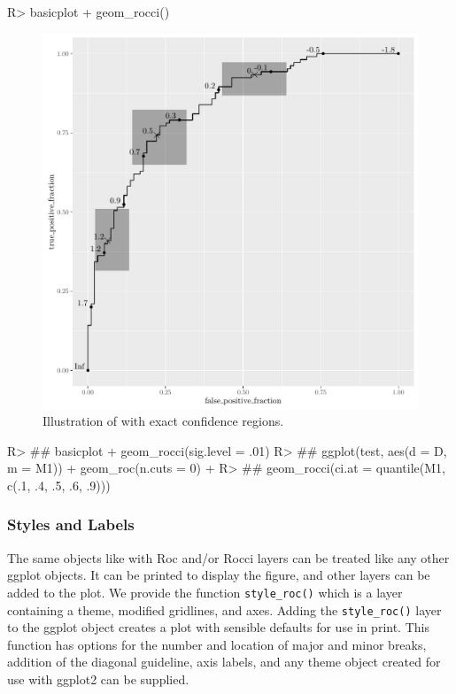 \documentclass[codesnippet]{jss}
\begin{document}
\begin{Schunk}
\begin{Sinput}
R> basicplot + geom_rocci()
\end{Sinput}
\begin{figure}
\includegraphics{figure/test-a-ci-1} \caption{Illustration of  with exact confidence regions. \label{ciex}}\label{fig:test-a-ci}
\end{figure}
\begin{Sinput}
R> ## basicplot + geom_rocci(sig.level = .01)
R> ## ggplot(test, aes(d = D, m = M1)) + geom_roc(n.cuts = 0) +
R> ##   geom_rocci(ci.at = quantile(M1, c(.1, .4, .5, .6, .9)))
\end{Sinput}
\end{Schunk}

\subsubsection{Styles and Labels}\label{styles-and-labels}

The same objects like  with Roc and/or Rocci layers can
be treated like any other ggplot objects. It can be printed to display
the figure, and other layers can be added to the plot. We provide the
function \texttt{style\_roc()} which is a layer containing a theme,
modified gridlines, and axes. Adding the \texttt{style\_roc()} layer to
the ggplot object creates a plot with sensible defaults for use in
print. This function has options for the number and location of major
and minor breaks, addition of the diagonal guideline, axis labels, and
any theme object created for use with ggplot2 can be supplied.
\end{document}
